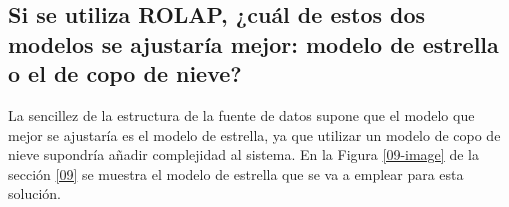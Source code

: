 \medskip
\subsection{Si se utiliza ROLAP, ¿cuál de estos dos modelos se ajustaría mejor: modelo de estrella o el de copo de nieve?}
La sencillez de la estructura de la fuente de datos supone que el modelo que mejor se ajustaría es el modelo de estrella, ya que utilizar un modelo de copo de nieve supondría añadir complejidad al sistema. En la Figura \ref{09-image} de la sección \ref{09} se muestra el modelo de estrella que se va a emplear para esta solución.
